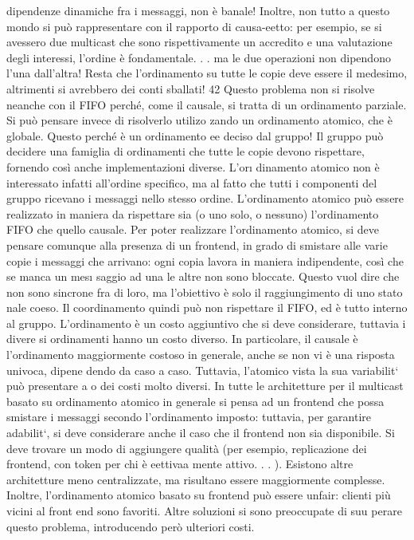 dipendenze dinamiche fra i messaggi, non è banale!
Inoltre, non tutto a questo mondo si può rappresentare con il rapporto di
causa-eetto: per esempio, se si avessero due multicast che sono rispettivamente
un accredito e una valutazione degli interessi, l'ordine è fondamentale. . . ma le
due operazioni non dipendono l'una dall'altra! Resta che l'ordinamento su tutte
le copie deve essere il medesimo, altrimenti si avrebbero dei conti sballati!
42
Questo problema non si risolve neanche con il FIFO perché, come il causale,
si tratta di un ordinamento parziale. Si può pensare invece di risolverlo utilizo
zando un ordinamento atomico, che è globale. Questo perché è un ordinamento
ee
deciso dal gruppo! Il gruppo può decidere una famiglia di ordinamenti che tutte
le copie devono rispettare, fornendo così anche implementazioni diverse. L'or\i{}
dinamento atomico non è interessato infatti all'ordine specifico, ma al fatto che
tutti i componenti del gruppo ricevano i messaggi nello stesso ordine. L'ordinamento atomico può essere realizzato in
maniera da rispettare sia (o uno solo, o
nessuno) l'ordinamento FIFO che quello causale.
Per poter realizzare l'ordinamento atomico, si deve pensare comunque alla
presenza di un frontend, in grado di smistare alle varie copie i messaggi che
arrivano: ogni copia lavora in maniera indipendente, così che se manca un mes\i{}
saggio ad una le altre non sono bloccate. Questo vuol dire che non sono sincrone
fra di loro, ma l'obiettivo è solo il raggiungimento di uno stato nale coeso. Il
coordinamento quindi può non rispettare il FIFO, ed è tutto interno al gruppo.
L'ordinamento è un costo aggiuntivo che si deve considerare, tuttavia i divere
si ordinamenti hanno un costo diverso. In particolare, il causale è l'ordinamento
maggiormente costoso in generale, anche se non vi è una risposta univoca, dipene
dendo da caso a caso. Tuttavia, l'atomico vista la sua variabilit` può presentare
a o
dei costi molto diversi.
In tutte le architetture per il multicast basato su ordinamento atomico in
generale si pensa ad un frontend che possa smistare i messaggi secondo l'ordinamento imposto: tuttavia, per garantire
adabilit`, si deve considerare anche il
caso che il frontend non sia disponibile. Si deve trovare un modo di aggiungere
qualità (per esempio, replicazione dei frontend, con token per chi è eettivaa
mente attivo. . . ). Esistono altre architetture meno centralizzate, ma risultano
essere maggiormente complesse.
Inoltre, l'ordinamento atomico basato su frontend può essere unfair: clienti
più vicini al front end sono favoriti. Altre soluzioni si sono preoccupate di suu
perare questo problema, introducendo però ulteriori costi.
